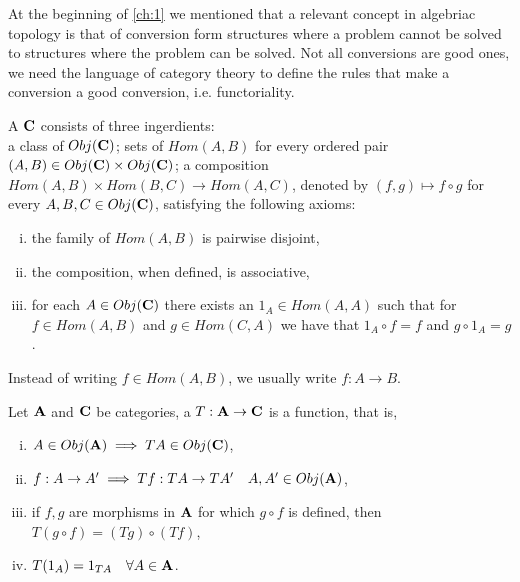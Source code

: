 \documentclass[../1.tex]{subfiles}
\begin{document}
    At the beginning of \autoref{ch:1} we mentioned that a relevant concept in algebriac topology is that of conversion form
    structures where a problem cannot be solved to structures where the problem can be solved. Not all conversions are good ones,
    we need the language of category theory to define the rules that make a conversion a good conversion, i.e. functoriality.

    \begin{defn}
        A  $\textbf{C}$ consists of three ingerdients:\\
        a class of  $Obj(\textbf{C})$; sets of 
        $Hom(A,B)$ for every ordered pair $(A,B) \in Obj(\textbf{C}) \times Obj(\textbf{C})$; a composition $Hom(A,B) \times Hom(B,C) \to Hom(A,C)$, denoted
        by $(f,g) \mapsto f \circ g$ for every $A,B,C \in Obj(\textbf{C})$, satisfying the following axioms:
        \begin{enumerate}[(i)]
            \item the family of $Hom(A,B)$ is pairwise disjoint,
            \item the composition, when defined, is associative,
            \item for each $A \in Obj(\textbf{C})$ there exists an  $1_A \in Hom(A,A)$ such that for $f \in Hom(A,B)$ and $g \in Hom(C,A)$
                  we have that $1_A \circ f = f$ and $g \circ 1_A = g$.
        \end{enumerate}
    \end{defn}

    Instead of writing $f \in Hom(A,B)$, we usually write $f : A \to B$. 

    \begin{defn}
        Let $\textbf{A}$ and $\textbf{C}$ be categories, a  $T : \textbf{A} \to \textbf{C}$ is a function, that is, 
        \begin{enumerate}[(i)]
            \item $A \in Obj(\textbf{A}) \implies TA \in Obj(\textbf{C})$,
            \item $f:A \to A' \implies Tf: TA \to TA' \quad A,A' \in Obj(\textbf{A})$,
            \item if $f,g$ are morphisms in $\textbf{A}$ for which $g \circ f$ is defined, then $T(g \circ f) = (Tg) \circ (Tf)$,
            \item $T(1_A)= 1_{TA} \quad \forall A \in \textbf{A}$.
        \end{enumerate}
    \end{defn}
\end{document}
